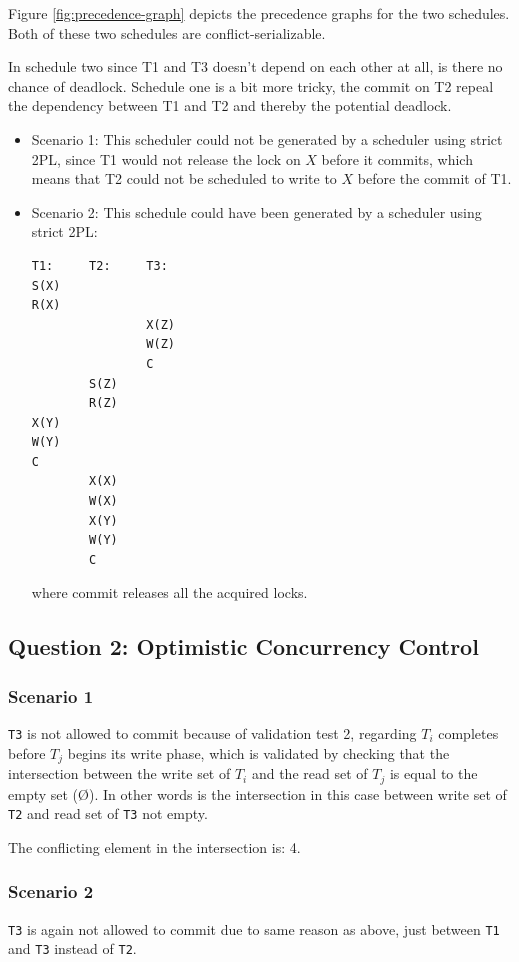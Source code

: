 \documentclass[10pt,a4paper]{article}
\begin{document}
Figure \ref{fig:precedence-graph} depicts the precedence graphs for the two schedules. Both of these two schedules are conflict-serializable. 
\newline

In schedule two since T1 and T3 doesn't depend on each other at all, is there no chance of deadlock. Schedule one is a bit more tricky, the commit on T2 repeal the dependency between T1 and T2 and thereby the potential deadlock.

\begin{itemize}
\item Scenario 1: This scheduler could not be generated by a scheduler using strict 2PL, since T1 would not release the lock on $X$ before it commits, which means that T2 could not be scheduled to write to $X$ before the commit of T1.
 
\item Scenario 2: This schedule could have been generated by a scheduler using strict 2PL:

\begin{lstlisting}[numbers=none]
T1:     T2:     T3:
S(X)
R(X)            
                X(Z)
                W(Z)
                C
        S(Z)
        R(Z)
X(Y)
W(Y)
C
        X(X)
        W(X)
        X(Y)
        W(Y)
        C
\end{lstlisting}

where commit releases all the acquired locks.
\end{itemize}

\subsection*{Question 2: Optimistic Concurrency Control}
\subsubsection*{Scenario 1}
\texttt{T3} is not allowed to commit because of validation test 2, regarding $T_i$ completes before $T_j$ begins its write phase, which is validated by checking that the intersection between the write set of $T_i$ and the read set of $T_j$ is equal to the empty set (Ø). In other words is the intersection in this case between write set of \texttt{T2} and read set of \texttt{T3} not empty.
\newline

The conflicting element in the intersection is: 4.

\subsubsection*{Scenario 2}
\texttt{T3} is again not allowed to commit due to same reason as above, just between \texttt{T1} and \texttt{T3} instead of \texttt{T2}.
\newline
\end{document}
